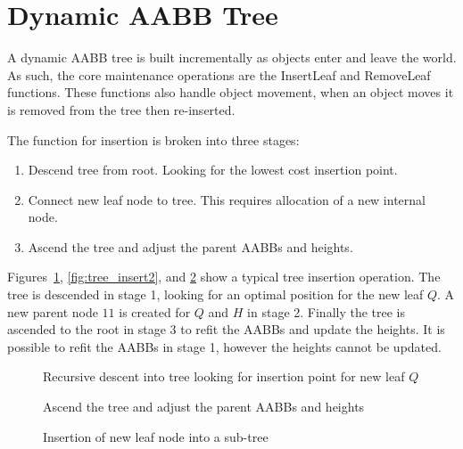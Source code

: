 \documentclass{article}
\begin{document}
\section{Dynamic AABB Tree}
A dynamic AABB tree is built incrementally as objects enter and leave the world. As such, the core maintenance operations are the InsertLeaf and RemoveLeaf functions. These functions also handle object movement, when an object moves it is removed from the tree then re-inserted.

The function for insertion is broken into three stages:
\begin{enumerate}
	\item Descend tree from root. Looking for the lowest cost insertion point.
	\item Connect new leaf node to tree. This requires allocation of a new internal node.
	\item Ascend the tree and adjust the parent AABBs and heights.
\end{enumerate}

Figures~\ref{fig:tree_insert1}, \ref{fig:tree_insert2}, and \ref{fig:tree_insert3} show a typical tree insertion operation. The tree is descended in stage 1, looking for an optimal position for the new leaf $Q$. A new parent node $11$ is created for $Q$ and $H$ in stage 2. Finally the tree is ascended to the root in stage 3 to refit the AABBs and update the heights. It is possible to refit the AABBs in stage 1, however the heights cannot be updated.

\begin{figure}
	\begin{center}
		
	\end{center}
	\caption{Recursive descent into tree looking for insertion point for new leaf $Q$}
	\label{fig:tree_insert1}
\end{figure}




\begin{figure}
	\begin{center}
		
	\end{center}
	\caption{Ascend the tree and adjust the parent AABBs and heights}
	\label{fig:tree_insert3}
\end{figure}

\begin{figure}
	\begin{center}
		
	\end{center}
	\caption{Insertion of new leaf node into a sub-tree}
	\label{fig:new_leaf}
\end{figure}
\end{document}
